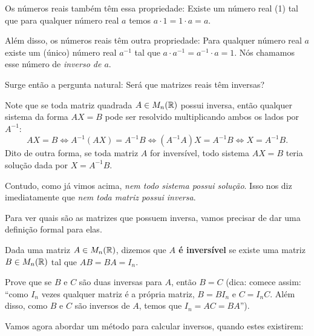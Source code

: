 Os números reais também têm essa propriedade: Existe um número real (1) tal que para qualquer número real $a$ temos $a\cdot 1=1\cdot a=a$.

Além disso, os números reais têm outra propriedade: Para qualquer número real $a$ existe um (único) número real $a^{-1}$ tal que $a\cdot a^{-1}=a^{-1}\cdot a=1$. Nós chamamos esse número de \textit{inverso de $a$}.

Surge então a pergunta natural: Será que matrizes reais têm inversas?

\begin{rmk}
	Note que se toda matriz quadrada $A\in M_n(\mathbb R)$ possui inversa, então qualquer sistema da forma $AX=B$ pode ser resolvido multiplicando ambos os lados por $A^{-1}$:
	\[AX=B\Leftrightarrow A^{-1}(AX)=A^{-1}B\Leftrightarrow(A^{-1}A)X=A^{-1}B\Leftrightarrow X=A^{-1}B.\] Dito de outra forma, se toda matriz $A$ for inversível, todo sistema $AX=B$ teria solução dada por $X=A^{-1}B$.
\end{rmk}

Contudo, como já vimos acima, \textit{nem todo sistema possui solução}. Isso nos diz imediatamente que \textit{nem toda matriz possui inversa}.

Para ver quais são as matrizes que possuem inversa, vamos precisar de dar uma definição formal para elas.

\begin{df}
	Dada uma matriz $A\in M_n(\mathbb R)$, dizemos que \textbf{$A$ é inversível} se existe uma matriz $B\in M_n(\mathbb R)$ tal que $AB=BA=I_n$.
\end{df}

\begin{exerc}
	Prove que se $B$ e $C$ são duas inversas para $A$, então $B=C$ (dica: comece assim: ``como $I_n$ vezes qualquer matriz é a própria matriz, $B=BI_n$ e $C=I_nC$. Além disso, como $B$ e $C$ são inversos de $A$, temos que $I_n=AC=BA$'').
\end{exerc}

Vamos agora abordar um método para calcular inversos, quando estes existirem:

